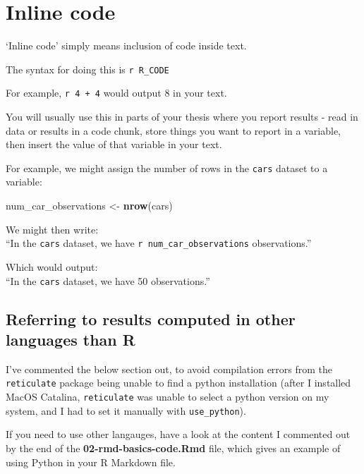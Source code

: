 \documentclass[a4paper, twoside]{templates/ociamthesis}
\newenvironment{Shaded}{\begin{snugshade}}{\end{snugshade}}
\newcommand{\KeywordTok}[1]{\textcolor[rgb]{0.13,0.29,0.53}{\textbf{#1}}}
\newcommand{\NormalTok}[1]{#1}
\newcommand{\StringTok}[1]{\textcolor[rgb]{0.31,0.60,0.02}{#1}}
\renewenvironment{Shaded}
{
  \vspace{4pt}%
  \begin{snugshade}%
}{%
  \end{snugshade}%
  \vspace{4pt}%
}
\begin{document}
\hypertarget{inline-code-1}{%
\section{Inline code}\label{inline-code-1}}

`Inline code' simply means inclusion of code inside text.

The syntax for doing this is \texttt{\textasciigrave{}r\ R\_CODE\textasciigrave{}}

For example, \texttt{\textasciigrave{}r\ 4\ +\ 4\textasciigrave{}} would output 8 in your text.

You will usually use this in parts of your thesis where you report results - read in data or results in a code chunk, store things you want to report in a variable, then insert the value of that variable in your text.

For example, we might assign the number of rows in the \texttt{cars} dataset to a variable:

\begin{Shaded}
\begin{Highlighting}[]
\NormalTok{num_car_observations <-}\StringTok{ }\KeywordTok{nrow}\NormalTok{(cars)}
\end{Highlighting}
\end{Shaded}

We might then write:\\
``In the \texttt{cars} dataset, we have \texttt{\textasciigrave{}r\ num\_car\_observations\textasciigrave{}} observations.''

Which would output:\\
``In the \texttt{cars} dataset, we have 50 observations.''

\hypertarget{referring-to-results-computed-in-other-languages-than-r}{%
\subsection{Referring to results computed in other languages than R}\label{referring-to-results-computed-in-other-languages-than-r}}

I've commented the below section out, to avoid compilation errors from the \texttt{reticulate} package being unable to find a python installation (after I installed MacOS Catalina, \texttt{reticulate} was unable to select a python version on my system, and I had to set it manually with \texttt{use\_python}).

If you need to use other langauges, have a look at the content I commented out by the end of the \textbf{02-rmd-basics-code.Rmd} file, which gives an example of using Python in your R Markdown file.
\end{document}
